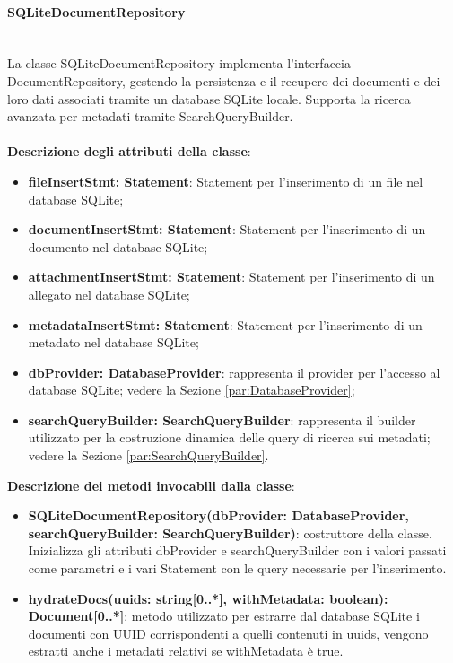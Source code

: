 \documentclass[a4paper,12pt]{article}
\begin{document}
{{{                \paragraph{SQLiteDocumentRepository}\label{par:SQLiteDocumentRepository}\mbox{}\\
                La classe SQLiteDocumentRepository implementa l'interfaccia DocumentRepository, gestendo la persistenza e il recupero dei documenti e dei loro dati associati tramite un database SQLite locale. Supporta la ricerca avanzata per metadati tramite SearchQueryBuilder.\\
                \\
                \textbf{Descrizione degli attributi della classe}:
                \begin{itemize}
                    \item \textbf{fileInsertStmt: Statement}: Statement per l'inserimento di un file nel database SQLite;
                    \item \textbf{documentInsertStmt: Statement}: Statement per l'inserimento di un documento nel database SQLite;
                    \item \textbf{attachmentInsertStmt: Statement}: Statement per l'inserimento di un allegato nel database SQLite;
                    \item \textbf{metadataInsertStmt: Statement}: Statement per l'inserimento di un metadato nel database SQLite;
                    \item \textbf{dbProvider: DatabaseProvider}: rappresenta il provider per l'accesso al database SQLite; vedere la Sezione \ref{par:DatabaseProvider};
                    \item \textbf{searchQueryBuilder: SearchQueryBuilder}: rappresenta il builder utilizzato per la costruzione dinamica delle query di ricerca sui metadati; vedere la Sezione \ref{par:SearchQueryBuilder}.
                \end{itemize}
                \noindent \textbf{Descrizione dei metodi invocabili dalla classe}:
                \begin{itemize}
                    \item \textbf{SQLiteDocumentRepository(dbProvider: DatabaseProvider,\\ searchQueryBuilder: SearchQueryBuilder)}: costruttore della classe. Inizializza gli attributi dbProvider e searchQueryBuilder con i valori passati come parametri e i vari Statement con le query necessarie per l'inserimento.
                    \item \textbf{hydrateDocs(uuids: string[0..*], withMetadata: boolean): Document[0..*]}: metodo utilizzato per estrarre dal database SQLite i documenti con UUID corrispondenti a quelli contenuti in uuids, vengono estratti anche i metadati relativi se withMetadata è true. 
                \end{itemize}
}}}
\end{document}
